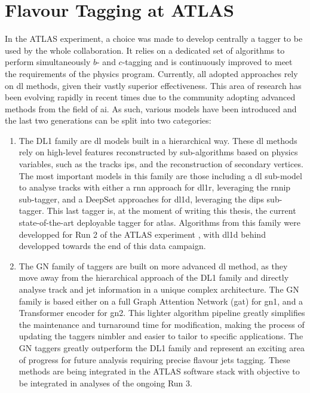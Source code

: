 \section{Flavour Tagging at ATLAS}
In the ATLAS experiment, a choice was made to develop centrally a tagger to be used by the whole collaboration. It relies on a dedicated set of algorithms to perform simultaneously $b$- and $c$-tagging and is continuously improved to meet the requirements of the physics program. Currently, all adopted approaches rely on \gls{dl} methods, given their vastly superior effectiveness. This area of research has been evolving rapidly in recent times due to the community adopting advanced methods from the field of \gls{ai}. As such, various models have been introduced and the last two generations can be split into two categories: 
\begin{enumerate}
  \item The DL1 family are \gls{dl} models built in a hierarchical way. These \gls{dl} methods rely on high-level features reconstructed by sub-algorithms based on physics variables, such as the tracks \glspl{ip}, and the reconstruction of secondary vertices. The most important models in this family are those including a \gls{dl} sub-model to analyse tracks with either a \gls{rnn} approach for \gls{dl1r}, leveraging the \gls{rnnip} sub-tagger, and a DeepSet approaches for \gls{dl1d}, leveraging the \gls{dips} sub-tagger. This last tagger is, at the moment of writing this thesis, the current state-of-the-art deployable tagger for \gls{atlas}. Algorithms from this family were developped for Run 2 of the ATLAS experiment \cite{atlas:FTAGRUN2}, with \gls{dl1d} behind developped towards the end of this data campaign.
  \item The GN family of taggers are built on more advanced \gls{dl} method, as they move away from the hierarchical approach of the DL1 family and directly analyse track and jet information in a unique complex architecture. The GN family is based either on a full Graph Attention Network (\gls{gat}) for \gls{gn1}, and a Transformer encoder for \gls{gn2}. This lighter algorithm pipeline greatly simplifies the maintenance and turnaround time for modification, making the process of updating the taggers nimbler and easier to tailor to specific applications. The GN taggers greatly outperform the DL1 family and represent an exciting area of progress for future analysis requiring precise flavour jets tagging. These methods are being integrated in the ATLAS software stack with objective to be integrated in analyses of the ongoing Run 3.  
\end{enumerate}

